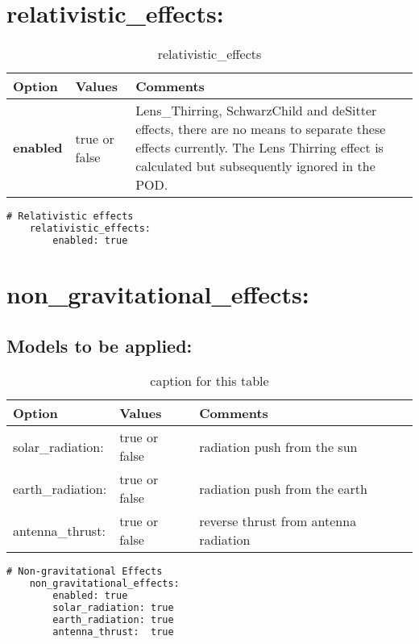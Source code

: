 \section{relativistic\_effects:}
\begin{table}[h!]
	\begin{tabular}{|p{4.5cm}|p{2cm}|p{3.5cm}|}
		\hline
		Option & Values & Comments \\
		\hline
		\textbf{enabled} & true or false & Lens\_Thirring, SchwarzChild and deSitter effects, there are no means to separate these effects currently. The Lens Thirring effect is calculated but subsequently ignored in the POD.\\
		\hline
	\end{tabular}
	\caption{relativistic\_effects}
	\label{table:label_name}
\end{table}
%
{\small
	\begin{lstlisting}[language=xml,caption=yaml example for relativistic effects]
# Relativistic effects
	relativistic_effects:
		enabled: true
	\end{lstlisting}
}
\section{non\_gravitational\_effects:}
\subsection{Models to be applied:}
\begin{table}[h!]
	\begin{tabular}{|p{4.5cm}|p{2cm}|p{3.5cm}|}
		\hline
		Option & Values & Comments \\
		\hline
		solar\_radiation: & true or false & radiation push from the sun \\
		earth\_radiation: & true or false & radiation push from the earth \\
		antenna\_thrust:  & true or false & reverse thrust from antenna radiation \\
		\hline
	\end{tabular}
	\caption{caption for this table}
	\label{table:label_name}
\end{table}
%
{\small
	\begin{lstlisting}[language=xml,caption=yaml example for non gravitational effects]
	# Non-gravitational Effects
	non_gravitational_effects:
		enabled: true
		solar_radiation: true
		earth_radiation: true
		antenna_thrust:  true
	\end{lstlisting}
}
